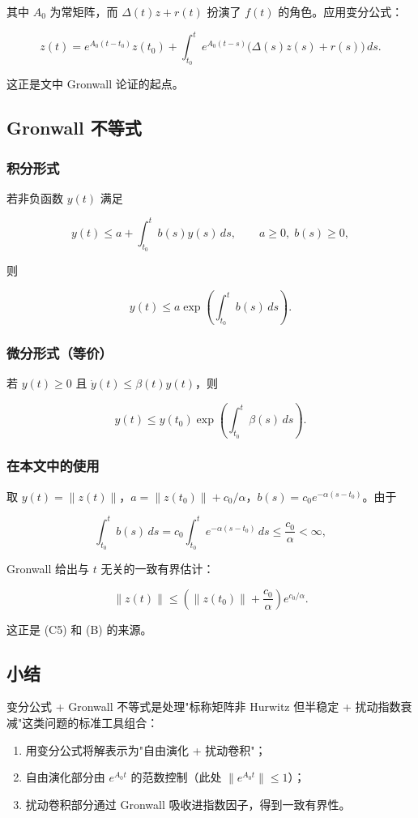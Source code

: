 \documentclass[UTF8,fontset=fandol]{ctexart}
\begin{document}
其中 $A_0$ 为常矩阵，而 $\Delta(t)z + r(t)$ 扮演了 $f(t)$ 的角色。应用变分公式：

\[
z(t) = e^{A_0(t-t_0)} z(t_0)
+ \int_{t_0}^{t} e^{A_0(t-s)} \bigl(\Delta(s) z(s) + r(s)\bigr)\,ds.
\]

这正是文中 Gronwall 论证的起点。

\subsection{Gronwall 不等式}

\subsubsection*{积分形式}

若非负函数 $y(t)$ 满足

\[
y(t) \leq a + \int_{t_0}^{t} b(s) y(s)\,ds,
\qquad a \geq 0,\; b(s) \geq 0,
\]

则

\[
y(t) \leq a \exp\!\left(\int_{t_0}^{t} b(s)\,ds\right).
\]

\subsubsection*{微分形式（等价）}

若 $y(t) \geq 0$ 且 $\dot{y}(t) \leq \beta(t) y(t)$，则

\[
y(t) \leq y(t_0) \exp\!\left(\int_{t_0}^{t} \beta(s)\,ds\right).
\]

\subsubsection*{在本文中的使用}

取 $y(t) = \|z(t)\|$，$a = \|z(t_0)\| + c_0/\alpha$，$b(s) = c_0 e^{-\alpha(s-t_0)}$。由于

\[
\int_{t_0}^{t} b(s)\,ds
= c_0 \int_{t_0}^{t} e^{-\alpha(s-t_0)}\,ds
\leq \frac{c_0}{\alpha} < \infty,
\]

Gronwall 给出与 $t$ 无关的一致有界估计：

\[
\|z(t)\| \leq \left(\|z(t_0)\| + \frac{c_0}{\alpha}\right) e^{c_0/\alpha}.
\]

这正是 (C5) 和 (B) 的来源。

\subsection{小结}

变分公式 + Gronwall 不等式是处理"标称矩阵非 Hurwitz 但半稳定 + 扰动指数衰减"这类问题的标准工具组合：

\begin{enumerate}
  \item 用变分公式将解表示为"自由演化 + 扰动卷积"；
  \item 自由演化部分由 $e^{A_0 t}$ 的范数控制（此处 $\|e^{A_0 t}\| \leq 1$）；
  \item 扰动卷积部分通过 Gronwall 吸收进指数因子，得到一致有界性。
\end{enumerate}
\end{document}
